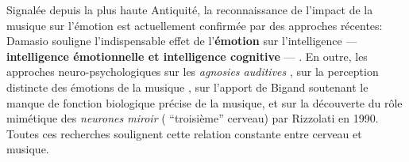 Signalée depuis la plus haute Antiquité,  la reconnaissance de
l'impact de la musique sur l'émotion est actuellement confirmée par
des approches récentes: Damasio
souligne l'indispensable effet de l'\textbf{émotion}
sur l'intelligence   ---     \textbf{intelligence émotionnelle et intelligence
  cognitive} --- \autocite {damasio:lautre}.
En outre, les approches neuro-psychologiques sur les \textit{agnosies
  auditives} \autocite{seron.baron.ea:neuropsychologie},
sur la perception distincte des émotions de la musique
\autocite{platel_neuropsychology_2002},
sur l'apport de Bigand  \autocite {bigand:cerveau}
soutenant le
manque de fonction biologique précise de la musique,
et sur la
découverte du rôle mimétique des\textit{ neurones miroir }( ``troisième''
cerveau) par Rizzolati \autocite{Rizzolati} en 1990.
Toutes ces recherches soulignent cette relation constante entre cerveau et musique.


